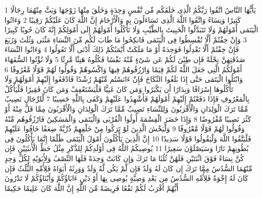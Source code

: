 {\tiny\colorbox{cl_aya}{1}} يَأَيُّهَا النَّاسُ اتَّقُوا رَبَّكُمُ الَّذِى خَلَقَكُم مِّن نَّفْسٍ وَحِدَةٍ وَخَلَقَ مِنْهَا زَوْجَهَا وَبَثَّ مِنْهُمَا رِجَالًا كَثِيرًا وَنِسَاءً وَاتَّقُوا اللَّهَ الَّذِى تَسَاءَلُونَ بِهِ وَالْأَرْحَامَ إِنَّ اللَّهَ كَانَ عَلَيْكُمْ رَقِيبًا
{\tiny\colorbox{cl_aya}{2}} وَءَاتُوا الْيَتَمَى أَمْوَلَهُمْ وَلَا تَتَبَدَّلُوا الْخَبِيثَ بِالطَّيِّبِ وَلَا تَأْكُلُوا أَمْوَلَهُمْ إِلَى أَمْوَلِكُمْ إِنَّهُ كَانَ حُوبًا كَبِيرًا
{\tiny\colorbox{cl_aya}{3}} وَإِنْ خِفْتُمْ أَلَّا تُقْسِطُوا فِى الْيَتَمَى فَانكِحُوا مَا طَابَ لَكُم مِّنَ النِّسَاءِ مَثْنَى وَثُلَثَ وَرُبَعَ فَإِنْ خِفْتُمْ أَلَّا تَعْدِلُوا فَوَحِدَةً أَوْ مَا مَلَكَتْ أَيْمَنُكُمْ ذَلِكَ أَدْنَى أَلَّا تَعُولُوا
{\tiny\colorbox{cl_aya}{4}} وَءَاتُوا النِّسَاءَ صَدُقَتِهِنَّ نِحْلَةً فَإِن طِبْنَ لَكُمْ عَن شَىْءٍ مِّنْهُ نَفْسًا فَكُلُوهُ هَنِئًا مَّرِئًا
{\tiny\colorbox{cl_aya}{5}} وَلَا تُؤْتُوا السُّفَهَاءَ أَمْوَلَكُمُ الَّتِى جَعَلَ اللَّهُ لَكُمْ قِيَمًا وَارْزُقُوهُمْ فِيهَا وَاكْسُوهُمْ وَقُولُوا لَهُمْ قَوْلًا مَّعْرُوفًا
{\tiny\colorbox{cl_aya}{6}} وَابْتَلُوا الْيَتَمَى حَتَّى إِذَا بَلَغُوا النِّكَاحَ فَإِنْ ءَانَسْتُم مِّنْهُمْ رُشْدًا فَادْفَعُوا إِلَيْهِمْ أَمْوَلَهُمْ وَلَا تَأْكُلُوهَا إِسْرَافًا وَبِدَارًا أَن يَكْبَرُوا وَمَن كَانَ غَنِيًّا فَلْيَسْتَعْفِفْ وَمَن كَانَ فَقِيرًا فَلْيَأْكُلْ بِالْمَعْرُوفِ فَإِذَا دَفَعْتُمْ إِلَيْهِمْ أَمْوَلَهُمْ فَأَشْهِدُوا عَلَيْهِمْ وَكَفَى بِاللَّهِ حَسِيبًا
{\tiny\colorbox{cl_aya}{7}} لِّلرِّجَالِ نَصِيبٌ مِّمَّا تَرَكَ الْوَلِدَانِ وَالْأَقْرَبُونَ وَلِلنِّسَاءِ نَصِيبٌ مِّمَّا تَرَكَ الْوَلِدَانِ وَالْأَقْرَبُونَ مِمَّا قَلَّ مِنْهُ أَوْ كَثُرَ نَصِيبًا مَّفْرُوضًا
{\tiny\colorbox{cl_aya}{8}} وَإِذَا حَضَرَ الْقِسْمَةَ أُولُوا الْقُرْبَى وَالْيَتَمَى وَالْمَسَكِينُ فَارْزُقُوهُم مِّنْهُ وَقُولُوا لَهُمْ قَوْلًا مَّعْرُوفًا
{\tiny\colorbox{cl_aya}{9}} وَلْيَخْشَ الَّذِينَ لَوْ تَرَكُوا مِنْ خَلْفِهِمْ ذُرِّيَّةً ضِعَفًا خَافُوا عَلَيْهِمْ فَلْيَتَّقُوا اللَّهَ وَلْيَقُولُوا قَوْلًا سَدِيدًا
{\tiny\colorbox{cl_aya}{10}} إِنَّ الَّذِينَ يَأْكُلُونَ أَمْوَلَ الْيَتَمَى ظُلْمًا إِنَّمَا يَأْكُلُونَ فِى بُطُونِهِمْ نَارًا وَسَيَصْلَوْنَ سَعِيرًا
{\tiny\colorbox{cl_aya}{11}} يُوصِيكُمُ اللَّهُ فِى أَوْلَدِكُمْ لِلذَّكَرِ مِثْلُ حَظِّ الْأُنثَيَيْنِ فَإِن كُنَّ نِسَاءً فَوْقَ اثْنَتَيْنِ فَلَهُنَّ ثُلُثَا مَا تَرَكَ وَإِن كَانَتْ وَحِدَةً فَلَهَا النِّصْفُ وَلِأَبَوَيْهِ لِكُلِّ وَحِدٍ مِّنْهُمَا السُّدُسُ مِمَّا تَرَكَ إِن كَانَ لَهُ وَلَدٌ فَإِن لَّمْ يَكُن لَّهُ وَلَدٌ وَوَرِثَهُ أَبَوَاهُ فَلِأُمِّهِ الثُّلُثُ فَإِن كَانَ لَهُ إِخْوَةٌ فَلِأُمِّهِ السُّدُسُ مِن بَعْدِ وَصِيَّةٍ يُوصِى بِهَا أَوْ دَيْنٍ ءَابَاؤُكُمْ وَأَبْنَاؤُكُمْ لَا تَدْرُونَ أَيُّهُمْ أَقْرَبُ لَكُمْ نَفْعًا فَرِيضَةً مِّنَ اللَّهِ إِنَّ اللَّهَ كَانَ عَلِيمًا حَكِيمًا
